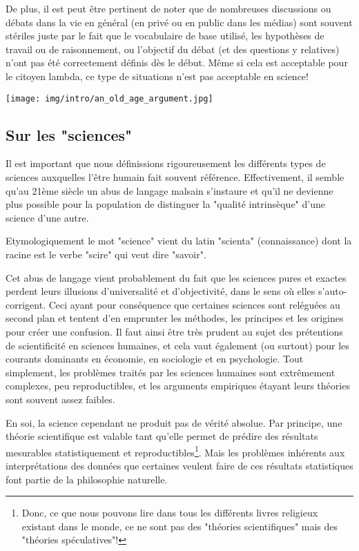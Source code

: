	De plus, il est peut être pertinent de noter que de nombreuses discussions ou d\'ebats dans la vie en g\'en\'eral (en priv\'e ou en public dans les m\'edias) sont souvent st\'eriles juste par le fait que le vocabulaire de base utilis\'e, les hypothèses de travail ou de raisonnement, ou l'objectif du d\'ebat (et des questions y relatives) n'ont pas \'et\'e correctement d\'efinis dès le d\'ebut. Même si cela est acceptable pour le citoyen lambda, ce type de situations n'est pas acceptable en science!
	\begin{center}
		\texttt{[image: img/intro/an\_old\_age\_argument.jpg]}
	\end{center}

	\subsection{Sur les "sciences"}	
	Il est important que nous d\'efinissions rigoureusement les diff\'erents types de sciences auxquelles l'être humain fait souvent r\'ef\'erence. Effectivement, il semble qu'au 21ème siècle un abus de langage malsain s'instaure et qu'il ne devienne plus possible pour la population de distinguer la "qualit\'e intrinsèque" d'une science d'une autre.

	\begin{tcolorbox}[title=Remarque,colframe=black,arc=10pt]
	Etymologiquement le mot "science" vient du latin "scienta" (connaissance) dont la racine est le verbe "scire" qui veut dire "savoir".
	\end{tcolorbox}
	
	Cet abus de langage vient probablement du fait que les sciences pures et exactes perdent leurs illusions d'universalit\'e et d'objectivit\'e, dans le sens où elles s'auto-corrigent. Ceci ayant pour cons\'equence que certaines sciences sont rel\'egu\'ees au second plan et tentent d'en emprunter les m\'ethodes, les principes et les origines pour cr\'eer une confusion. Il faut ainsi être très prudent au sujet des pr\'etentions de scientificit\'e en sciences humaines, et cela vaut \'egalement (ou surtout) pour les courants dominants en \'economie, en sociologie et en psychologie. Tout simplement, les problèmes trait\'es par les sciences humaines sont extrêmement complexes, peu reproductibles, et les arguments empiriques \'etayant leurs th\'eories sont souvent assez faibles.

	\marginnote{\textcolor{NavyBlue}{{\footnotesize \textbf{~\thechapter:\myparagraph}}}}En soi, la science cependant ne produit pas de v\'erit\'e absolue. Par principe, une th\'eorie scientifique est valable tant qu'elle permet de pr\'edire des r\'esultats mesurables statistiquement et reproductibles\footnote{Donc, ce que nous pouvons lire dans tous les différents livres religieux existant dans le monde, ce ne sont pas des "théories scientifiques" mais des "théories spéculatives"!}. Mais les problèmes inhérents aux interpr\'etations des données que certaines veulent faire de ces r\'esultats statistiques font partie de la philosophie naturelle.
	
